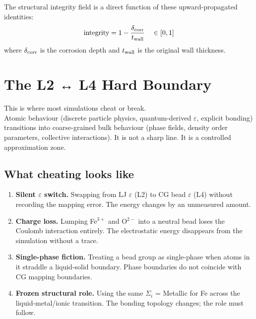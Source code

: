 \documentclass[11pt, a4paper, oneside]{article}
\theoremstyle{definition}
\begin{document}
The structural integrity field is a direct function of these upward-propagated
identities:
\[
  \text{integrity} = 1 - \frac{\delta_{\rm corr}}{t_{\rm wall}}
  \quad \in [0, 1]
\]
where $\delta_{\rm corr}$ is the corrosion depth and $t_{\rm wall}$ is the
original wall thickness.

\section{The L2 ↔ L4 Hard Boundary}
\label{sec:boundary}

\begin{tcolorbox}[colback=hardcol, colframe=red!70!black,
  title={Hard Problem 1: The L2 ↔ L4 Phase Transition Boundary},
  fonttitle=\bfseries\small, breakable]
This is where most simulations cheat or break.\\[4pt]
Atomic behaviour (discrete particle physics, quantum-derived $\varepsilon$,
explicit bonding) transitions into coarse-grained bulk behaviour (phase
fields, density order parameters, collective interactions).
It is not a sharp line.  It is a controlled approximation zone.
\end{tcolorbox}

\subsection{What cheating looks like}

\begin{enumerate}
  \item \textbf{Silent $\varepsilon$ switch.}
        Swapping from LJ $\varepsilon$ (L2) to CG bead $\varepsilon$ (L4)
        without recording the mapping error.  The energy changes by an
        unmeasured amount.

  \item \textbf{Charge loss.}
        Lumping Fe$^{3+}$ and O$^{2-}$ into a neutral bead loses the
        Coulomb interaction entirely.  The electrostatic energy disappears
        from the simulation without a trace.

  \item \textbf{Single-phase fiction.}
        Treating a bead group as single-phase when atoms in it straddle
        a liquid-solid boundary.  Phase boundaries do not coincide with
        CG mapping boundaries.

  \item \textbf{Frozen structural role.}
        Using the same $\Sigma_i$ = Metallic for Fe across the
        liquid-metal/ionic transition.  The bonding topology changes;
        the role must follow.
\end{enumerate}
\end{document}
